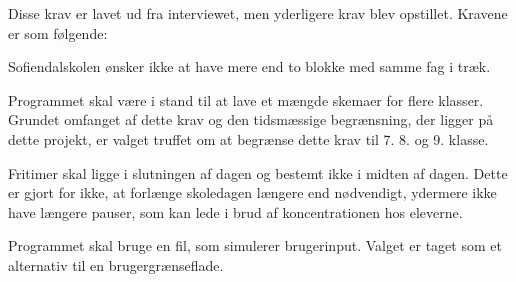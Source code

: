 Disse krav er lavet ud fra interviewet, men yderligere krav blev opstillet. Kravene er som følgende:

Sofiendalskolen ønsker ikke at have mere end to blokke med samme fag i træk. 

Programmet skal være i stand til at lave et mængde skemaer for flere klasser. Grundet omfanget af dette krav og den tidsmæssige begrænsning, der ligger på dette projekt, er valget truffet om at begrænse dette krav til 7. 8. og 9. klasse. 

Fritimer skal ligge i slutningen af dagen og bestemt ikke i midten af dagen. Dette er gjort for ikke, at forlænge skoledagen længere end nødvendigt, ydermere ikke have længere pauser, som kan lede i brud af koncentrationen hos eleverne.

Programmet skal bruge en fil, som simulerer brugerinput. Valget er taget som et alternativ til en brugergrænseflade.  
